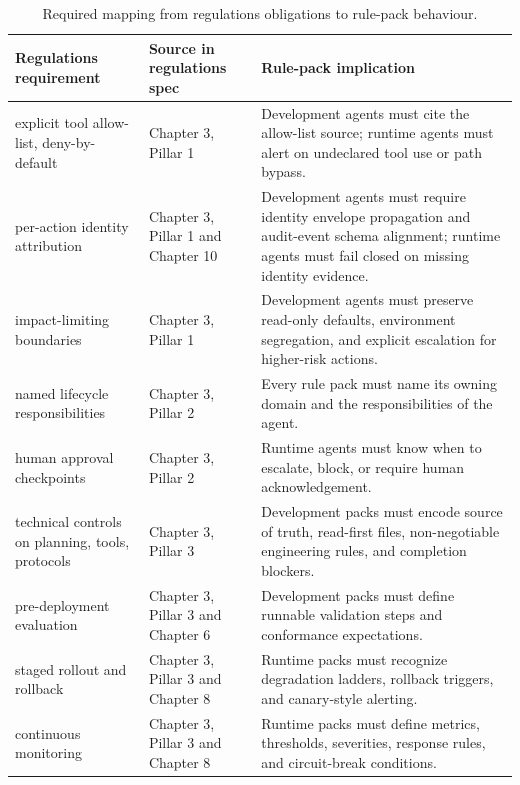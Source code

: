 \begin{table}[htbp]
\centering
\footnotesize
\caption{Required mapping from regulations obligations to rule-pack behaviour.}
\label{tab:reg-map}
\begin{tabularx}{\textwidth}{@{}L{3.2cm}L{3.0cm}X@{}}
\toprule
\textbf{Regulations requirement} & \textbf{Source in regulations spec} & \textbf{Rule-pack implication} \\
\midrule
{} explicit tool allow-list, deny-by-default & Chapter 3, Pillar 1 & Development agents must cite the allow-list source; runtime agents must alert on undeclared tool use or path bypass. \\
 per-action identity attribution & Chapter 3, Pillar 1 and Chapter 10 & Development agents must require identity envelope propagation and audit-event schema alignment; runtime agents must fail closed on missing identity evidence. \\
 impact-limiting boundaries & Chapter 3, Pillar 1 & Development agents must preserve read-only defaults, environment segregation, and explicit escalation for higher-risk actions. \\
 named lifecycle responsibilities & Chapter 3, Pillar 2 & Every rule pack must name its owning domain and the responsibilities of the agent. \\
 human approval checkpoints & Chapter 3, Pillar 2 & Runtime agents must know when to escalate, block, or require human acknowledgement. \\
 technical controls on planning, tools, protocols & Chapter 3, Pillar 3 & Development packs must encode source of truth, read-first files, non-negotiable engineering rules, and completion blockers. \\
 pre-deployment evaluation & Chapter 3, Pillar 3 and Chapter 6 & Development packs must define runnable validation steps and conformance expectations. \\
 staged rollout and rollback & Chapter 3, Pillar 3 and Chapter 8 & Runtime packs must recognize degradation ladders, rollback triggers, and canary-style alerting. \\
 continuous monitoring & Chapter 3, Pillar 3 and Chapter 8 & Runtime packs must define metrics, thresholds, severities, response rules, and circuit-break conditions. \\
\bottomrule
\end{tabularx}
\end{table}

